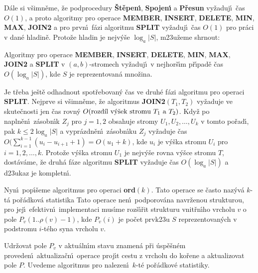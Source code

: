 \documentclass[a4paper,12pt]{article}
\begin{document}
\flushpar D\'ale si v\v simn\v eme, \v ze podprocedury {\bf \v St\v epen\'\i }, {\bf Spojen\'\i} a {\bf P\v re\-sun }
vy\v zaduj\'\i\ \v cas $O(1)$, a proto algoritmy pro operace {\bf MEMBER}, 
{\bf INSERT}, {\bf DELETE}, {\bf MIN}, {\bf MAX}, {\bf JOIN2} a pro prvn\'\i\ f\'azi algoritmu 
{\bf SPLIT} vy\v zaduj\'\i\ \v cas $O(1)$ pro pr\'aci v dan\'e hladin\v e.  Proto\v ze 
hladin je nejv\'y\v se $\log_a|S|$, m\accent23u\v zeme shrnout: 


Algoritmy pro operace {\bf MEMBER}, {\bf INSERT}, 
{\bf DE\-LETE}, {\bf MIN}, {\bf MAX}, {\bf JOIN2} a {\bf SPLIT} v $
(a,b)$-stromech vy\-\v zaduj\'\i\ 
v nejhor\v s\'\i m p\v r\'\i pad\v e \v cas $O(\log_a|S|)$, kde $
S$ je 
re\-pre\-zen\-tovan\'a mno\v zina.  
\endproclaim


\flushpar Je t\v reba je\v st\v e odhadnout spot\v rebovan\'y \v cas ve druh\'e f\'azi 
algoritmu pro operaci {\bf SPLIT}. Nejprve si v\v simn\v eme, \v ze 
algoritmus {\bf JOIN2$(T_1,T_2)$} vy\v zaduje ve skute\v cnosti jen \v cas 
rovn\'y 
$O(\text{\rm rozd\'\i l v\'y\v sek strom\accent23u }T_1\text{\rm \ a }
T_2)$. Kdy\v z po napln\v en\'\i\ 
z\'asobn\'\i k $Z_j$ pro $j=1,2$ obsahuje stromy $U_1,U_2,\dots,U_
k$ v tomto 
po\v rad\'\i , pak $k\le 2\log_a|S|$ a vypr\'azdn\v en\'\i\ z\'asobn\'\i ku $
Z_j$ 
vy\v zaduje 
\v cas $O(\sum_{i=1}^{k-1}(u_i-u_{i+1}+1)=O(u_1+k)$, kde $u_i$ je v\'y\v ska stromu $
U_i$ pro 
$i=1,2,\dots,k$. Proto\v ze v\'y\v ska stromu $U_1$ je nejv\'y\v se rovna v\'y\v sce 
stromu $T$, dost\'av\'ame, \v ze druh\'a f\'aze algoritmu {\bf SPLIT} vy\v zaduje 
\v cas $O(\log_a|S|)$ a d\accent23ukaz je kompletn\'\i . 
\medskip

\flushpar Nyn\'\i\ pop\'\i\v seme algoritmus pro operaci {\bf ord$
(k)$}. Tato 
operace se \v casto naz\'yv\'a $k$-t\'a po\v r\'adko\-v\'a statistika
Tato operace nen\'\i\ podporov\'ana navr\v zenou 
strukturou, pro jej\'\i\ efektivn\'\i\ implementaci mus\'\i me 
roz\v s\'\i\v rit strukturu vnit\v rn\'\i ho vrcholu $v$ o pole\newline 
$P_v(1..\rho (v)-1)$, kde $P_v(i)$ je po\v cet prvk\accent23u $S$ reprezentovan\'ych 
v podstromu $i$-t\'eho syna vrcholu $v$.
\smallskip
 
\flushpar Udr\v zovat pole $P_v$ v aktu\'aln\'\i m stavu znamen\'a p\v ri \'usp\v e\v sn\'em 
pro\-veden\'\i\ aktualiza\v cn\'\i\ operace proj\'\i t cestu z vrcholu do ko\v re\-ne 
a aktualizovat pole $P$. Uvedeme algoritmus pro 
naleze\-n\'\i\ $k$-t\'e po\v r\'adkov\'e statistiky.
\medskip
\end{document}
